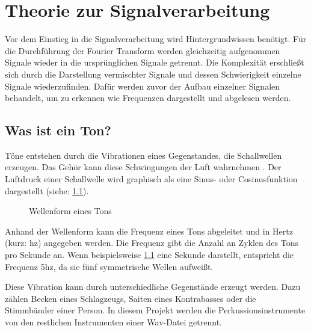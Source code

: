 \chapter{Theorie zur Signalverarbeitung}
\label{theorie}
%

Vor dem Einstieg in die Signalverarbeitung wird Hintergrundwissen benötigt. Für die Durchführung der Fourier Transform werden gleichzeitig aufgenommen Signale wieder in die ursprünglichen Signale getrennt. Die Komplexität erschließt sich durch die Darstellung vermischter Signale und dessen Schwierigkeit einzelne Signale wiederzufinden. Dafür werden zuvor der Aufbau einzelner Signalen behandelt, um zu erkennen wie Frequenzen dargestellt und abgelesen werden. 

%
\section{Was ist ein Ton?}
\label{sounds}
%

Töne entstehen durch die Vibrationen eines Gegenstandes, die Schallwellen erzeugen. Das Gehör kann diese Schwingungen der Luft wahrnehmen \parencite{signaltoene}. Der Luftdruck einer Schallwelle wird graphisch als eine Sinus- oder Cosinusfunktion dargestellt (siehe: \cref{wav_sound}).

%
\begin{figure}[h]
    \centering
    \caption{Wellenform eines Tons}
    \label{wav_sound}
\end{figure}
%

Anhand der Wellenform kann die Frequenz eines Tons abgeleitet und in Hertz (kurz: hz) angegeben werden. Die Frequenz gibt die Anzahl an Zyklen des Tons pro Sekunde an. Wenn beispielsweise \cref{wav_sound} eine Sekunde darstellt, entspricht die Frequenz 5hz, da sie fünf symmetrische Wellen aufweißt.

\par

Diese Vibration kann durch unterschiedliche Gegenstände erzeugt werden. Dazu zählen Becken eines Schlagzeugs, Saiten eines Kontrabasses oder die Stimmbänder einer Person. In diesem Projekt werden die Perkussionsinstrumente von den restlichen Instrumenten einer Wav-Datei getrennt.

